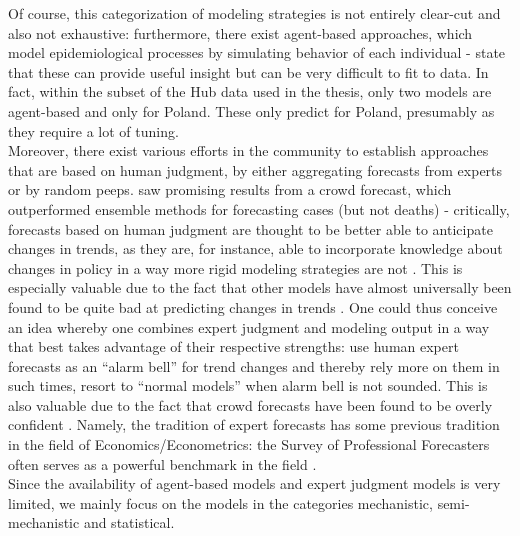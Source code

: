 Of course, this categorization of modeling strategies is not entirely clear-cut and also not  exhaustive: furthermore, there exist agent-based approaches, which model epidemiological processes by simulating behavior of each individual - \cite{zelner_accounting_2021} state that these can provide useful insight but can be very difficult to fit to data. In fact, within the subset of the Hub data used in the thesis, only two models are agent-based and only for Poland. These only predict for Poland, presumably as they require a lot of tuning. \\
Moreover, there exist various efforts in the community to establish approaches that are based on human judgment, by either aggregating forecasts from experts or by random peeps. \cite{bosse_comparing_2021} saw promising results from a crowd forecast, which outperformed ensemble methods for forecasting cases (but not deaths) - critically, forecasts based on human judgment are thought to be better able to anticipate changes in trends, as they are, for instance, able to incorporate knowledge about changes in policy in a way more rigid modeling strategies are not \cite{bracher_evaluating_2021}. This is especially valuable due to the fact that other models have almost universally been found to be quite bad at predicting changes in trends . One could thus conceive an idea whereby one combines expert judgment and modeling output in a way that best takes advantage of their respective strengths: use human expert forecasts as an ``alarm bell'' for trend changes and thereby rely more on them in such times, resort to ``normal models'' when alarm bell is not sounded. This is also valuable due to the fact that crowd forecasts have been found to be overly confident \cite{bosse_comparing_2021}. Namely, the tradition of expert forecasts has some previous tradition in the field of Economics/Econometrics: the Survey of Professional Forecasters often serves as a powerful benchmark in the field .\\
Since the availability of agent-based models and expert judgment models is very limited, we mainly focus on the models in the categories mechanistic, semi-mechanistic and statistical. \\
